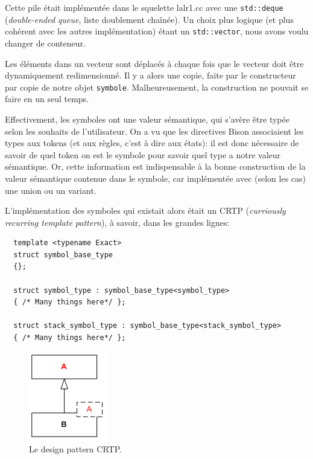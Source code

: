 \documentclass[a4paper,11pt,twoside,final]{article}
\begin{document}
  Cette pile était implémentée dans le squelette lalr1.cc avec une
  \texttt{std::deque} (\textit{double-ended queue}, liste doublement chaînée).
  Un choix plus logique (et plus cohérent avec les autres implémentation) étant
  un \texttt{std::vector}, nous avons voulu changer de conteneur.

  Les éléments dans un vecteur sont déplacés à chaque fois que le vecteur doit
  être dynamiquement redimensionné. Il y a alors une copie, faite par le
  constructeur par copie de notre objet \texttt{symbole}. Malheureusement, la
  construction ne pouvait se faire en un seul temps.

  Effectivement, les symboles ont une valeur sémantique, qui s'avère être typée
  selon les souhaits de l'utilisateur. On a vu que les directives Bison
  associaient les types aux tokens (et aux règles, c'est à dire aux états): il
  est donc nécessaire de savoir de quel token on est le symbole pour savoir
  quel type a notre valeur sémantique. Or, cette information est indispensable
  à la bonne construction de la valeur sémantique contenue dans le symbole, car
  implémentée avec (selon les cas) une union ou un variant.

  L'implémentation des symboles qui existait alors était un CRTP
  (\textit{curriously recurring template pattern}), à savoir, dans les grandes
  lignes:

  \begin{verbatim}
  template <typename Exact>
  struct symbol_base_type
  {};

  struct symbol_type : symbol_base_type<symbol_type>
  { /* Many things here*/ };

  struct stack_symbol_type : symbol_base_type<stack_symbol_type>
  { /* Many things here*/ };
  \end{verbatim}

  \begin{figure}[H]
    \begin{center}
      \includegraphics[scale=1]{images/crtp}
      \caption{Le design pattern CRTP.}
    \end{center}
  \end{figure}
\end{document}
